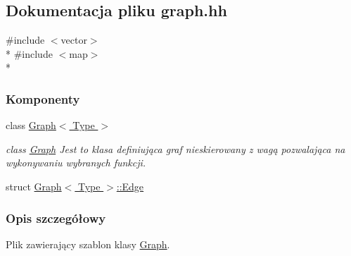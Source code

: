\hypertarget{graph_8hh}{\subsection{Dokumentacja pliku graph.\-hh}
\label{graph_8hh}
}
{\ttfamily \#include $<$vector$>$}\\*
{\ttfamily \#include $<$map$>$}\\*
\subsubsection*{Komponenty}
\begin{DoxyCompactItemize}
\item 
class \hyperlink{class_graph}{Graph$<$ Type $>$}
\begin{DoxyCompactList}\small\item\em class \hyperlink{class_graph}{Graph} Jest to klasa definiująca graf nieskierowany z wagą pozwalająca na wykonywaniu wybranych funkcji. \end{DoxyCompactList}\item 
struct \hyperlink{struct_graph_1_1_edge}{Graph$<$ Type $>$\-::\-Edge}
\end{DoxyCompactItemize}


\subsubsection{Opis szczegółowy}
Plik zawierający szablon klasy \hyperlink{class_graph}{Graph}. 